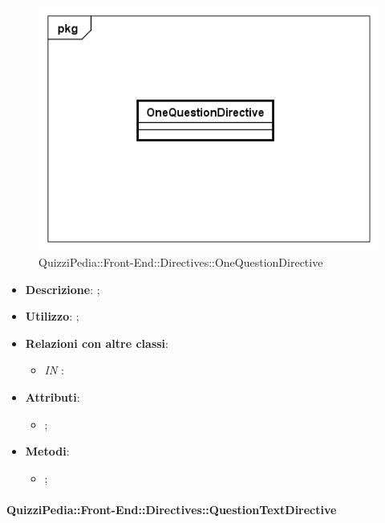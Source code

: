 \begin{figure}[h]
	\centering
	\includegraphics[scale=0.5,keepaspectratio]{UML/Classi/Front-End/QuizziPedia_Front-end_Directives_OneQuestionDirective.png}
	\caption{QuizziPedia::Front-End::Directives::OneQuestionDirective}
\end{figure}

\begin{itemize}
	\item \textbf{Descrizione}: ;
	\item \textbf{Utilizzo}: ;
	\item \textbf{Relazioni con altre classi}: 
	\begin{itemize}
		\item \textit{IN} \texttt{}: 
	\end{itemize}
	\item \textbf{Attributi}: 
	\begin{itemize}
		\item ;
	\end{itemize}
	\item \textbf{Metodi}: 
	\begin{itemize}
		\item ;
	\end{itemize}
\end{itemize}

\paragraph{QuizziPedia::Front-End::Directives::QuestionTextDirective}

\label{QuizziPedia::Front-End::Directives::QuestionTextDirective}

